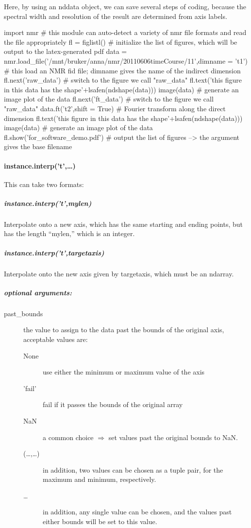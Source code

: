 Here, by using an nddata object, we can save several steps of coding,
    because the spectral width and resolution of the result are determined from
    axis labels.
    
\begin{python}
import nmr # this module can auto-detect a variety of nmr file formats and read the file appropriately
fl = figlistl() # initialize the list of figures, which will be output to the latex-generated pdf
data = nmr.load_file('/mnt/bruker/anna/nmr/20110606timeCourse/11',dimname = 't1') # this load an NMR fid file; dimname gives the name of the indirect dimension
fl.next('raw_data') # switch to the figure we call "raw_data"
fl.text('this figure in this data has the shape'+lsafen(ndshape(data)))
image(data) # generate an image plot of the data
fl.next('ft_data') # switch to the figure we call "raw_data"
data.ft('t2',shift = True) # Fourier transform along the direct dimension
fl.text('this figure in this data has the shape'+lsafen(ndshape(data)))
image(data) # generate an image plot of the data
fl.show('for_software_demo.pdf') # output the list of figures --> the argument gives the base filename
\end{python}
\paragraph{instance.interp('t',\ldots)}
This can take two formats:
\subparagraph{instance.interp('t',mylen)}
Interpolate onto a new axis, which has the same starting and ending points, but has the length ``mylen,'' which is an integer.
\subparagraph{instance.interp('t',targetaxis)}
Interpolate onto the new axis given by targetaxis, which must be an ndarray.
\subparagraph{optional arguments:}
\begin{mykwargs}
    \begin{description}
        \item[past\_bounds] the value to assign to the data past the bounds of the original axis, acceptable values are:
            \begin{description}
                \item[None] use either the minimum or maximum value of the axis
                \item['fail'] fail if it passes the bounds of the original array 
                \item[NaN] a common choice $\Rightarrow$ set values past the original bounds to NaN. 
                \item[(\ldots,\ldots)] in addition, two values can be chosen as a tuple pair, for the maximum and minimum, respectively.
                \item[\ldots] in addition, any single value can be chosen, and the values past either bounds will be set to this value.
            \end{description}
    \end{description}
\end{mykwargs}

